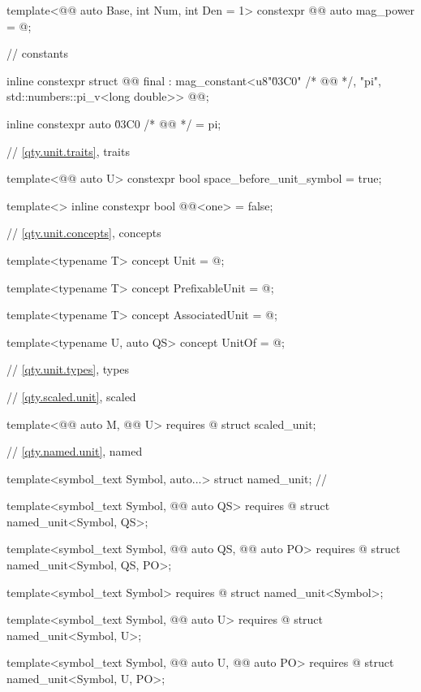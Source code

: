 \begin{codeblock}
{template<@@ auto Base, int Num, int Den = 1>
constexpr @@ auto mag_power = @\seebelownc@;

// constants

inline constexpr struct @@ final :
    mag_constant<{u8"\u03C0" /* @@ */, "pi"},
                 std::numbers::pi_v<long double>> {
} @@;

inline constexpr auto \u03C0 /* @@ */ = pi;

// \ref{qty.unit.traits}, traits

template<@@ auto U>
constexpr bool space_before_unit_symbol = true;

template<>
inline constexpr bool @@<one> = false;

// \ref{qty.unit.concepts}, concepts

template<typename T>
concept Unit = @\seebelownc@;

template<typename T>
concept PrefixableUnit = @\seebelownc@;

template<typename T>
concept AssociatedUnit = @\seebelownc@;

template<typename U, auto QS>
concept UnitOf = @\seebelownc@;

// \ref{qty.unit.types}, types

// \ref{qty.scaled.unit}, scaled

template<@@ auto M, @@ U>
  requires @\seebelownc@
struct scaled_unit;

// \ref{qty.named.unit}, named

template<symbol_text Symbol, auto...>
struct named_unit;  // \notdef

template<symbol_text Symbol, @@ auto QS>
  requires @\seebelownc@
struct named_unit<Symbol, QS>;

template<symbol_text Symbol, @@ auto QS, @@ auto PO>
  requires @\seebelownc@
struct named_unit<Symbol, QS, PO>;

template<symbol_text Symbol>
  requires @\seebelownc@
struct named_unit<Symbol>;

template<symbol_text Symbol, @@ auto U>
  requires @\seebelownc@
struct named_unit<Symbol, U>;

template<symbol_text Symbol, @@ auto U, @@ auto PO>
  requires @\seebelownc@
struct named_unit<Symbol, U, PO>;

}
\end{codeblock}
